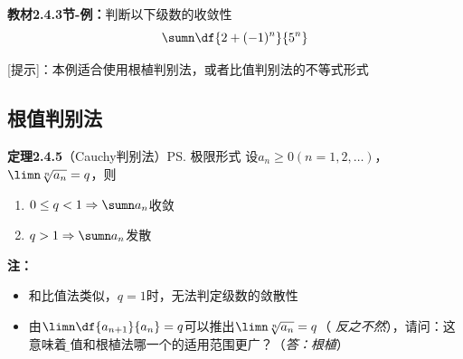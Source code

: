{\bf 教材2.4.3节-例：}判断以下级数的收敛性
$$\sumn\df{2+(-1)^n}{5^n}$$

[提示]：本例适合使用根植判别法，或者比值判别法的不等式形式

% 

\subsection{根值判别法}

{\bf 定理2.4.5}（Cauchy判别法）\ps{极限形式}
设$a_n\geq 0(n=1,2,\ldots)$，$\limn\sqrt[n]{a_n}=q$，则
\begin{enumerate}
  \setlength{\itemindent}{1cm}
  \item $0\leq q<1\Rightarrow\sumn a_n$收敛
  \item $q>1\Rightarrow\sumn a_n$发散
\end{enumerate}

{\bf 注：}
\begin{itemize}
  \setlength{\itemindent}{1cm}
  \item 和比值法类似，$q=1$时，无法判定级数的敛散性
  \item
  由$\limn\df{a_{n+1}}{a_n}=q$可以推出$\limn\sqrt[n]{a_n}=q$（
  {\it 反之不然}），请问：这意味着{\b 比值和根植法哪一个的适用范围更广？（{\it 答：根植}）}
\end{itemize}


% 
% 
% 

